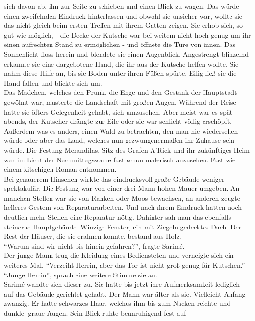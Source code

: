 sich davon ab, ihn zur Seite zu schieben und einen Blick zu wagen. Das würde einen zweifelnden 
Eindruck hinterlassen und obwohl sie unsicher war, wollte sie das nicht gleich beim ersten Treffen 
mit ihrem Gatten zeigen. Sie erhob sich, so gut wie möglich, - die Decke der Kutsche war bei weitem 
nicht hoch genug um ihr einen aufrechten Stand zu ermöglichen - und öffnete die Türe von innen. Das 
Sonnenlicht floss herein und blendete sie einen Augenblick. Angestrengt blinzelnd erkannte sie eine 
dargebotene Hand, die ihr aus der Kutsche helfen wollte. Sie nahm diese Hilfe an, bis sie Boden 
unter ihren Füßen spürte. Eilig ließ sie die Hand fallen und blickte sich um.\\
Das Mädchen, welches den Prunk, die Enge und den Gestank der Hauptstadt gewöhnt war, musterte die 
Landschaft mit großen Augen. Während der Reise hatte sie öfters Gelegenheit gehabt, sich umzusehen. 
Aber meist war es spät abends, der Kutscher drängte zur Eile oder sie war schlicht völlig 
erschöpft. Außerdem was es anders, einen Wald zu betrachten, den man nie wiedersehen würde oder 
aber das Land, welches nun gezwungenermaßen ihr Zuhause sein würde. Die Festung Merandilas, Sitz 
des Grafen A'Rick und ihr zukünftiges Heim war im Licht der Nachmittagssonne fast schon malerisch 
anzusehen.
Fast wie einem kitschigen Roman entnommen.\\
Bei genauerem Hinsehen wirkte das eindrucksvoll große Gebäude weniger spektakulär. Die Festung war 
von einer drei Mann hohen Mauer umgeben. An manchen Stellen war sie von Ranken oder Moos bewachsen, 
an anderen zeugte helleres Gestein von Reparaturarbeiten. Und nach ihrem Eindruck hatten noch 
deutlich mehr Stellen eine Reparatur nötig. Dahinter sah man das ebenfalls steinerne Hauptgebäude. 
Winzige Fenster, ein mit Ziegeln gedecktes Dach. Der Rest der Häuser, die sie erahnen konnte, 
bestand aus Holz. \\
``Warum sind wir nicht bis hinein gefahren?'', fragte Sarimé.\\
Der junge Mann trug die Kleidung eines Bediensteten und verneigte sich ein weiteres Mal. ``Verzeiht 
Herrin, aber das Tor ist nicht groß genug für Kutschen.''\\
``Junge Herrin'', sprach eine weitere Stimme sie an.\\
Sarimé wandte sich dieser zu. Sie hatte bis jetzt ihre Aufmerksamkeit lediglich auf das Gebäude 
gerichtet gehabt. Der Mann war älter als sie. Vielleicht Anfang zwanzig. Er hatte schwarzes Haar, 
welches ihm bis zum Nacken reichte und dunkle, graue Augen. Sein Blick ruhte beunruhigend fest auf 
